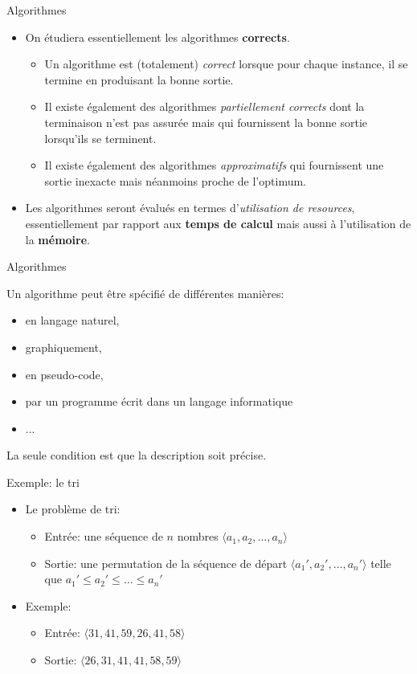 \begin{frame}{Algorithmes}
\begin{itemize}
\item On étudiera essentiellement les algorithmes {\bf corrects}.
\begin{itemize}
\item Un algorithme est (totalement) {\em correct} lorsque pour chaque instance, il se termine en produisant la bonne sortie.
\item Il existe également des algorithmes {\em partiellement corrects} dont la terminaison n'est pas assurée mais qui fournissent la bonne sortie lorsqu'ils se terminent.
\item Il existe également des algorithmes {\em approximatifs} qui fournissent une sortie inexacte mais néanmoins proche de l'optimum.
\end{itemize}
\bigskip
\item Les algorithmes seront évalués en termes d'{\em utilisation de resources}, essentiellement par rapport aux {\bf temps de calcul} mais aussi à l'utilisation de la {\bf mémoire}.
\end{itemize}
\end{frame}

\begin{frame}{Algorithmes}

Un algorithme peut être spécifié de différentes manières:
\begin{itemize}
\item en langage naturel,
\item graphiquement,
\item en pseudo-code,
\item par un programme écrit dans un langage informatique
\item ...
\end{itemize}
La seule condition est que la description soit précise.

\end{frame}


\begin{frame}{Exemple: le tri}
\begin{itemize}
\item Le problème de tri:
\begin{itemize}
\item Entrée: une séquence de $n$ nombres $\langle a_1,a_2,\ldots,a_n\rangle$
\item Sortie: une permutation de la séquence de départ $\langle a_1',a_2',\ldots,a_n'\rangle$ telle que $a_1'\leq a_2'\leq\ldots\leq a_n'$
\end{itemize}
\bigskip
\item Exemple:
\begin{itemize}
\item Entrée: $\langle 31,41,59,26,41,58\rangle$
\item Sortie: $\langle 26,31,41,41,58,59\rangle$
\end{itemize}
\end{itemize}

\end{frame}

